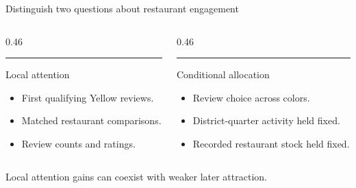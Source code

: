 \documentclass[aspectratio=169,11pt]{beamer}
\begin{document}
\begin{frame}{Distinguish two questions about restaurant engagement}
\begin{columns}[T,onlytextwidth]
\begin{column}{0.46\textwidth}
{\color{PMBlue}\rule{\linewidth}{0.8pt}}\par\vspace{0.45cm}
{\rmfamily\fontsize{23}{28}\selectfont Local attention}\par\vspace{0.5cm}
\begin{itemize}\setlength{\itemsep}{0.55cm}
\item First qualifying Yellow reviews.
\item Matched restaurant comparisons.
\item Review counts and ratings.
\end{itemize}
\end{column}
\begin{column}{0.46\textwidth}
\vspace{0.12cm}
{\color{PMYellow}\rule{\linewidth}{0.8pt}}\par\vspace{0.45cm}
{\rmfamily\fontsize{23}{28}\selectfont Conditional allocation}\par\vspace{0.5cm}
\begin{itemize}\setlength{\itemsep}{0.55cm}
\item Review choice across colors.
\item District-quarter activity held fixed.
\item Recorded restaurant stock held fixed.
\end{itemize}
\end{column}
\end{columns}
\vspace{0.75cm}
\begin{PMtakeaway}
Local attention gains can coexist with weaker later attraction.
\end{PMtakeaway}
\end{frame}
\end{document}
